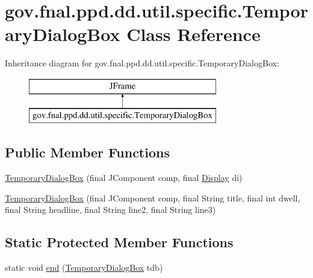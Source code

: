 \hypertarget{classgov_1_1fnal_1_1ppd_1_1dd_1_1util_1_1specific_1_1TemporaryDialogBox}{\section{gov.\-fnal.\-ppd.\-dd.\-util.\-specific.\-Temporary\-Dialog\-Box Class Reference}
\label{classgov_1_1fnal_1_1ppd_1_1dd_1_1util_1_1specific_1_1TemporaryDialogBox}
}
Inheritance diagram for gov.\-fnal.\-ppd.\-dd.\-util.\-specific.\-Temporary\-Dialog\-Box\-:\begin{figure}[H]
\begin{center}
\leavevmode
\includegraphics[height=2.000000cm]{classgov_1_1fnal_1_1ppd_1_1dd_1_1util_1_1specific_1_1TemporaryDialogBox}
\end{center}
\end{figure}
\subsection*{Public Member Functions}
\begin{DoxyCompactItemize}
\item 
\hyperlink{classgov_1_1fnal_1_1ppd_1_1dd_1_1util_1_1specific_1_1TemporaryDialogBox_aa54547c04811d3120a49706ffddb2aea}{Temporary\-Dialog\-Box} (final J\-Component comp, final \hyperlink{interfacegov_1_1fnal_1_1ppd_1_1dd_1_1signage_1_1Display}{Display} di)
\item 
\hyperlink{classgov_1_1fnal_1_1ppd_1_1dd_1_1util_1_1specific_1_1TemporaryDialogBox_ac4a840cc06ba5f87f7ded86949105bd0}{Temporary\-Dialog\-Box} (final J\-Component comp, final String title, final int dwell, final String headline, final String line2, final String line3)
\end{DoxyCompactItemize}
\subsection*{Static Protected Member Functions}
\begin{DoxyCompactItemize}
\item 
static void \hyperlink{classgov_1_1fnal_1_1ppd_1_1dd_1_1util_1_1specific_1_1TemporaryDialogBox_a42346f1414e26b70d57f28791738372e}{end} (\hyperlink{classgov_1_1fnal_1_1ppd_1_1dd_1_1util_1_1specific_1_1TemporaryDialogBox}{Temporary\-Dialog\-Box} tdb)
\end{DoxyCompactItemize}


